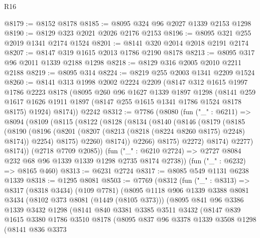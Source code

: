 \begin{lexlean}{R16}
\begin{coremodule}
@8179 := @8152 @8178
@8185 := @8095 @324 @96 @2027 @1339 @2153 @1298
@8190 := @8129 @323 @2021 @2026 @2176 @2153
@8196 := @8095 @321 @255 @2019 @1341 @2174 @1524
@8201 := @8141 @320 @2014 @2018 @2191 @2174
@8207 := @8147 @319 @1615 @2013 @1786 @2190 @8178
@8213 := @8095 @317 @96 @2011 @1339 @2188 @1298
@8218 := @8129 @316 @2005 @2010 @2211 @2188
@8219 := @8095 @314
@8224 := @8219 @255 @2003 @1341 @2209 @1524
@8260 := @8141
    @313
    @1998
    @2002
    @2224
    @2209
    (@8147
      @312
      @1615
      @1997
      @1786
      @2223
      @8178
      (@8095
        @260
        @96
        @1627
        @1339
        @1897
        @1298
        (@8141 @259 @1617 @1626 @1911 @1897 (@8147 @255 @1615 @1341 @1786 @1524 @8178 @8175) @1924)
        @8174))
    @2242
@8312 := @7786
    (@8080
      (fun ("_" : @6211) =>
      @8094
        (@8109
          (@8115
            (@8122
              (@8128
                (@8134
                  (@8140
                    (@8146
                      (@8179
                        (@8185
                          (@8190
                            (@8196
                              (@8201 (@8207 (@8213 (@8218 (@8224 @8260 @8175) @2248) @8174)) @2254)
                              @8175)
                            @2260)
                          @8174))
                      @2266)
                    @8175)
                  @2272)
                @8174)
              @2277)
            @8174))
        (@2718 @7709 @2085))
      (fun ("_" : @6210 @2724) => @2727 @8084 @232 @68 @96 @1339 @1339 @1298 @2735 @8174 @2738))
    (fun ("_" : @6232) => @8165 @460)
@8313 := @6231 @2724
@8317 := @8085 @549 @1131 @6238 @1339
@8318 := @1295 @8081
@8503 := @7769
    (@8312
      (fun ("_" : @8313) =>
      @8317
        (@8318 @3434)
        (@109 @7781)
        (@8095
          @1118
          @906
          @1339
          @3388
          @8081
          @3434
          (@8102 @373 @8081 (@1449 (@8105 @373)))
          (@8095
            @841
            @96
            @3386
            @1339
            @3432
            @1298
            (@8141
              @840
              @3381
              @3385
              @3511
              @3432
              (@8147
                @839
                @1615
                @3380
                @1786
                @3510
                @8178
                (@8095
                  @837
                  @96
                  @3378
                  @1339
                  @3508
                  @1298
                  (@8141
                    @836
                    @3373

\end{coremodule}
\end{lexlean}
